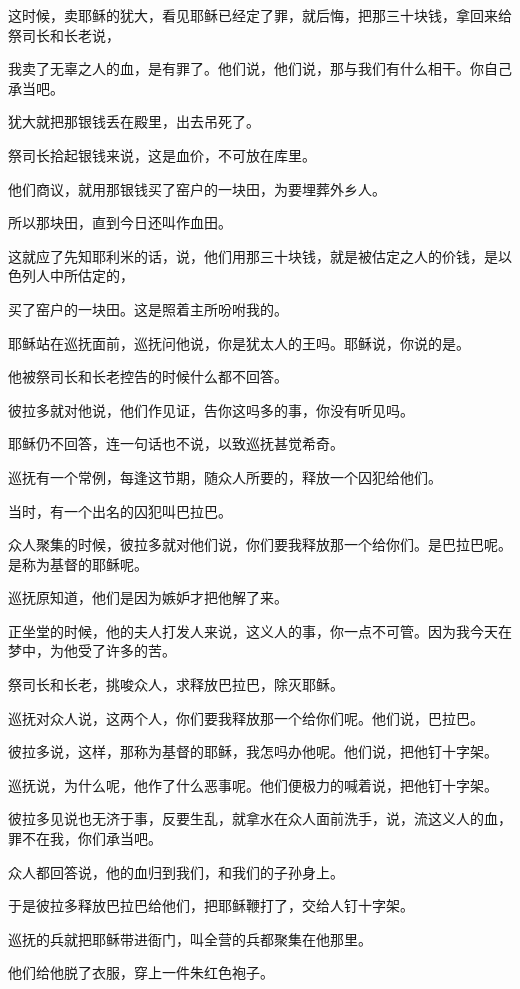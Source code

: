 \documentclass[12pt,oneside]{book}
\begin{document}
这时候，卖耶稣的犹大，看见耶稣已经定了罪，就后悔，把那三十块钱，拿回来给祭司长和长老说，

我卖了无辜之人的血，是有罪了。他们说，他们说，那与我们有什么相干。你自己承当吧。

犹大就把那银钱丢在殿里，出去吊死了。

祭司长拾起银钱来说，这是血价，不可放在库里。

他们商议，就用那银钱买了窑户的一块田，为要埋葬外乡人。

所以那块田，直到今日还叫作血田。

这就应了先知耶利米的话，说，他们用那三十块钱，就是被估定之人的价钱，是以色列人中所估定的，

买了窑户的一块田。这是照着主所吩咐我的。

耶稣站在巡抚面前，巡抚问他说，你是犹太人的王吗。耶稣说，你说的是。

他被祭司长和长老控告的时候什么都不回答。

彼拉多就对他说，他们作见证，告你这吗多的事，你没有听见吗。

耶稣仍不回答，连一句话也不说，以致巡抚甚觉希奇。

巡抚有一个常例，每逢这节期，随众人所要的，释放一个囚犯给他们。

当时，有一个出名的囚犯叫巴拉巴。

众人聚集的时候，彼拉多就对他们说，你们要我释放那一个给你们。是巴拉巴呢。是称为基督的耶稣呢。

巡抚原知道，他们是因为嫉妒才把他解了来。

正坐堂的时候，他的夫人打发人来说，这义人的事，你一点不可管。因为我今天在梦中，为他受了许多的苦。

祭司长和长老，挑唆众人，求释放巴拉巴，除灭耶稣。

巡抚对众人说，这两个人，你们要我释放那一个给你们呢。他们说，巴拉巴。

彼拉多说，这样，那称为基督的耶稣，我怎吗办他呢。他们说，把他钉十字架。

巡抚说，为什么呢，他作了什么恶事呢。他们便极力的喊着说，把他钉十字架。

彼拉多见说也无济于事，反要生乱，就拿水在众人面前洗手，说，流这义人的血，罪不在我，你们承当吧。

众人都回答说，他的血归到我们，和我们的子孙身上。

于是彼拉多释放巴拉巴给他们，把耶稣鞭打了，交给人钉十字架。

巡抚的兵就把耶稣带进衙门，叫全营的兵都聚集在他那里。

他们给他脱了衣服，穿上一件朱红色袍子。
\end{document}
